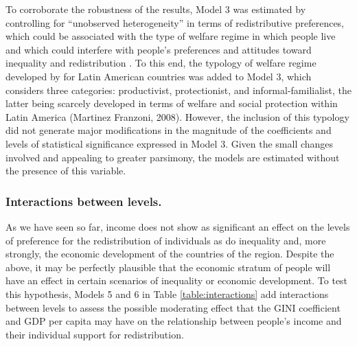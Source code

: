 \documentclass[utf8]{frontiersSCNS} %
\begin{document}
To corroborate the robustness of the results, Model 3 was estimated by controlling for “unobserved heterogeneity” in terms of redistributive preferences, which could be associated with the type of welfare regime in which people live and which could interfere with people’s preferences and attitudes toward inequality and redistribution \parencite{Schmidt-CatranEconomicinequalitypublic2016}. To this end, the typology of welfare regime developed by \textcite{MartinezFranzoniWelfareRegimesLatin2008} for Latin American countries was added to Model 3, which considers three categories: productivist, protectionist, and informal-familialist, the latter being scarcely developed in terms of welfare and social protection within Latin America (Martinez Franzoni, 2008). However, the inclusion of this typology did not generate major modifications in the magnitude of the coefficients and levels of statistical significance expressed in Model 3. Given the small changes involved and appealing to greater parsimony, the models are estimated without the presence of this variable.

\subsubsection{Interactions between levels.}

As we have seen so far, income does not show as significant an effect on the levels of preference for the redistribution of individuals as do inequality and, more strongly, the economic development of the countries of the region. Despite the above, it may be perfectly plausible that the economic stratum of people will have an effect in certain scenarios of inequality or economic development. To test this hypothesis, Models 5 and 6 in Table \ref{table:interactions} add interactions between levels to assess the possible moderating effect that the GINI coefficient and GDP per capita may have on the relationship between people’s income and their individual support for redistribution.
\end{document}
